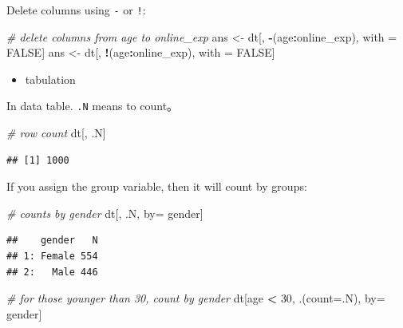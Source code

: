 \documentclass[12pt,]{krantz}
\makeatletter
\newenvironment{Shaded}{\begin{snugshade}}{\end{snugshade}}
\newcommand{\CommentTok}[1]{\textcolor[rgb]{0.37,0.37,0.37}{\textit{#1}}}
\newcommand{\DataTypeTok}[1]{\textcolor[rgb]{0.27,0.27,0.27}{#1}}
\newcommand{\DecValTok}[1]{\textcolor[rgb]{0.06,0.06,0.06}{#1}}
\newcommand{\NormalTok}[1]{#1}
\newcommand{\OperatorTok}[1]{\textcolor[rgb]{0.43,0.43,0.43}{\textbf{#1}}}
\newcommand{\OtherTok}[1]{\textcolor[rgb]{0.37,0.37,0.37}{#1}}
\newcommand{\StringTok}[1]{\textcolor[rgb]{0.5,0.5,0.5}{#1}}
\providecommand{\tightlist}{%
  \setlength{\itemsep}{0pt}\setlength{\parskip}{0pt}}
\newenvironment{kframe}{%
\medskip{}
\setlength{\fboxsep}{.8em}
 \def\at@end@of@kframe{}%
 \ifinner\ifhmode%
  \def\at@end@of@kframe{\end{minipage}}%
  \begin{minipage}{\columnwidth}%
 \fi\fi%
 \def\FrameCommand##1{\hskip\@totalleftmargin \hskip-\fboxsep
 \colorbox{shadecolor}{##1}\hskip-\fboxsep
     \hskip-\linewidth \hskip-\@totalleftmargin \hskip\columnwidth}%
 \MakeFramed {\advance\hsize-\width
   \@totalleftmargin\z@ \linewidth\hsize
   \@setminipage}}%
 {\par\unskip\endMakeFramed%
 \at@end@of@kframe}
\renewenvironment{Shaded}{\begin{kframe}}{\end{kframe}}
\makeatother
\begin{document}
Delete columns using \texttt{-} or \texttt{!}:

\begin{Shaded}
\begin{Highlighting}[]
\CommentTok{# delete columns from  age to online_exp}
\NormalTok{ans <-}\StringTok{ }\NormalTok{dt[, }\OperatorTok{-}\NormalTok{(age}\OperatorTok{:}\NormalTok{online_exp), with =}\StringTok{ }\OtherTok{FALSE}\NormalTok{]}
\NormalTok{ans <-}\StringTok{ }\NormalTok{dt[, }\OperatorTok{!}\NormalTok{(age}\OperatorTok{:}\NormalTok{online_exp), with =}\StringTok{ }\OtherTok{FALSE}\NormalTok{]}
\end{Highlighting}
\end{Shaded}

\begin{itemize}
\tightlist
\item
  tabulation
\end{itemize}

In data table. \texttt{.N} means to count。

\begin{Shaded}
\begin{Highlighting}[]
\CommentTok{# row count}
\NormalTok{dt[, .N] }
\end{Highlighting}
\end{Shaded}

\begin{verbatim}
## [1] 1000
\end{verbatim}

If you assign the group variable, then it will count by groups:

\begin{Shaded}
\begin{Highlighting}[]
\CommentTok{# counts by gender}
\NormalTok{dt[, .N, by=}\StringTok{ }\NormalTok{gender]  }
\end{Highlighting}
\end{Shaded}

\begin{verbatim}
##    gender   N
## 1: Female 554
## 2:   Male 446
\end{verbatim}

\begin{Shaded}
\begin{Highlighting}[]
\CommentTok{# for those younger than 30, count by gender}
\NormalTok{ dt[age }\OperatorTok{<}\StringTok{ }\DecValTok{30}\NormalTok{, .(}\DataTypeTok{count=}\NormalTok{.N), by=}\StringTok{ }\NormalTok{gender] }
\end{Highlighting}
\end{Shaded}
\end{document}
